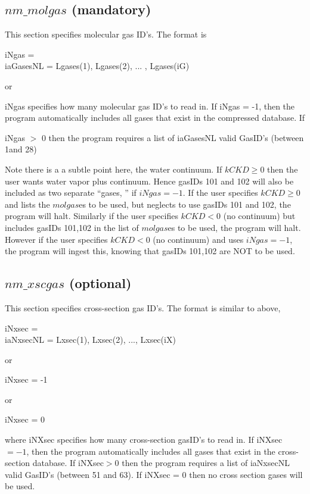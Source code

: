 \documentclass[12pt]{article}
\newcommand{\ttab}{\indent\indent}
\begin{document}
\subsection{$nm\_molgas$ (mandatory)}

This section specifies molecular gas ID's.  The format is

\smallskip
{\sf
\ttab iNgas = \\
\ttab iaGasesNL = Lgases(1), Lgases(2), ...  , Lgases(iG)
}

\smallskip
\noindent or

\smallskip
{\sf
\ttab{\sf iNgas = -1}
}

\medskip\noindent 
{\sf iNgas} specifies how many molecular gas ID's to read in.  If {\sf
iNgas = -1}, then the program automatically includes all gases that exist
in the compressed database.  If {\sf iNgas $>$ 0 then the program
requires a list of {\sf iaGasesNL} valid GasID's (between 1and 28)

Note there is a a subtle point here, the water continuum. If $kCKD \ge 0$ then 
the user wants water vapor plus continuum. Hence gasIDs 101 and 102 will also
be included as two separate ``gases, '' if $iNgas = -1$. If the user
specifies $kCKD \ge 0$ and lists the $molgas$es to be used, but neglects to
use gasIDs 101 and 102, the program will halt. Similarly if the user
specifies $kCKD < 0$ (no continuum) but includes gasIDs 101,102 in the list
of $molgas$es to be used, the program will halt. However if the user
specifies $kCKD <  0$ (no continuum) and uses $iNgas = -1$, the program will
ingest this, knowing that gasIDs 101,102 are NOT to be used.

\subsection{$nm\_xscgas$ (optional)}

This section specifies cross-section gas ID's.  The format is similar to 
above,

\smallskip
{\sf 
\ttab iNxsec = \\
\ttab iaNxsecNL = Lxsec(1),  Lxsec(2),  ..., Lxsec(iX)
}

\smallskip
\noindent or 

\smallskip
{\sf 
\ttab iNxsec = -1
}

\smallskip
\noindent or 

\smallskip
{\sf 
\ttab iNxsec = 0
}

\medskip\noindent 
where {\sf iNXsec} specifies how many cross-section gasID's to read in.
If {\sf iNXsec} $ = -1$, then the program automatically includes all gases
that exist in the cross-section database.  If {\sf iNXsec}$> 0$ then the
program requires a list of {\sf iaNxsecNL} valid GasID's (between 51 and
63).  If {\sf iNXsec} = 0 then no cross section gases will be used.

}
\end{document}

